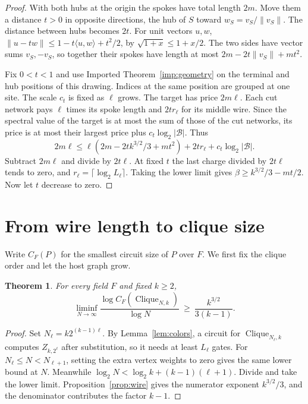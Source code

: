\documentclass[11pt,letterpaper]{article}
\newtheorem{theorem}{Theorem}[section]
\theoremstyle{importstyle}
\newcommand{\Clique}{\operatorname{Clique}}
\newcommand{\bal}{\mathcal B}
\newcommand{\norm}[1]{\lVert#1\rVert}
\newcommand{\inner}[2]{\langle#1,#2\rangle}
\begin{document}
\begin{proof}
With both hubs at the origin the spokes have total length \(2m\).
Move them a distance \(t>0\) in opposite directions, the hub of \(S\)
toward \(w_S=v_S/\norm{v_S}\). The distance between hubs becomes \(2t\).
For unit vectors \(u,w\),
\(\norm{u-tw}\le 1-t\inner{u}{w}+t^2/2\), by
\(\sqrt{1+x}\le1+x/2\). The two sides have vector sums \(v_S,-v_S\),
so together their spokes have length at most
\(2m-2t\norm{v_S}+mt^2\).

Fix \(0<t<1\) and use Imported Theorem~\ref{imp:geometry} on the
terminal and hub positions of this drawing. Indices at the same position
are grouped at one site. The scale \(c_t\) is fixed as \(\ell\) grows.
The target has price \(2m\ell\). Each cut network pays \(\ell\) times
its spoke length and \(2t r_\ell\) for its middle wire. Since the
spectral value of the target is at most the sum of those of the cut
networks, its price is at most their largest price plus
\(c_t\log_2|\bal|\). Thus
\[
  2m\ell\le \ell(2m-2t k^{3/2}/3+mt^2)+2t r_\ell+c_t\log_2|\bal|.
\]
Subtract \(2m\ell\) and divide by \(2t\ell\). At fixed \(t\) the last
charge divided by \(2t\ell\) tends to zero, and
\(r_\ell=\lceil\log_2 L_\ell\rceil\). Taking the lower limit gives
\(\beta\ge k^{3/2}/3-mt/2\). Now let \(t\) decrease to zero.
\end{proof}

\section{From wire length to clique size}

Write \(C_F(P)\) for the smallest circuit size of \(P\) over \(F\).
We first fix the clique order and let the host graph grow.

\begin{theorem}
For every field \(F\) and fixed \(k\ge2\),
\[
  \liminf_{N\to\infty}\frac{\log C_F(\Clique_{N,k})}{\log N}
          \ \ge\ \frac{k^{3/2}}{3(k-1)} .
\]
\end{theorem}
\begin{proof}
Set \(N_\ell=k2^{(k-1)\ell}\). By Lemma~\ref{lem:colors}, a circuit
for \(\Clique_{N_\ell,k}\) computes \(Z_{k,2^\ell}\) after substitution,
so it needs at least \(L_\ell\) gates. For \(N_\ell\le N<N_{\ell+1}\),
setting the extra vertex weights to zero gives the same lower bound
at \(N\). Meanwhile \(\log_2 N<\log_2 k+(k-1)(\ell+1)\).
Divide and take the lower limit. Proposition~\ref{prop:wire} gives
the numerator exponent \(k^{3/2}/3\), and the denominator contributes
the factor \(k-1\).
\end{proof}
\end{document}
